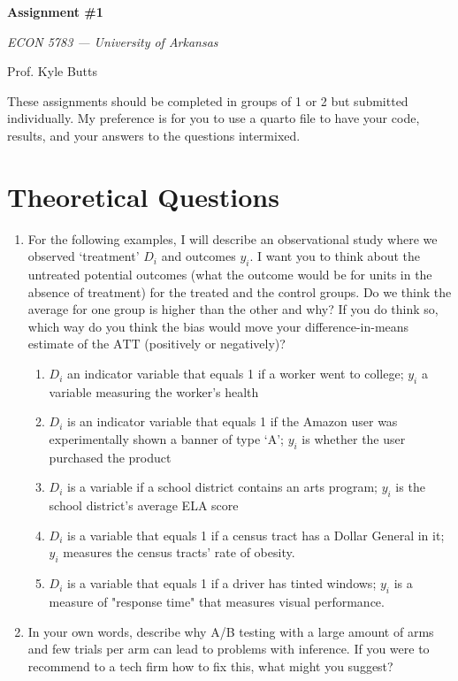 \documentclass[12pt]{article}
\begin{document}
\begin{center}
  {\Huge\bf Assignment \#1}
  
  \smallskip
  {\large\it  ECON 5783 — University of Arkansas}

  \medskip
  {\large Prof. Kyle Butts}
\end{center}

These assignments should be completed in groups of 1 or 2 but submitted individually. 
My preference is for you to use a quarto file to have your code, results, and your answers to the questions intermixed. 

\section*{Theoretical Questions}

\begin{enumerate}
  \item For the following examples, I will describe an observational study where we observed `treatment' $D_i$ and outcomes $y_i$. I want you to think about the untreated potential outcomes (what the outcome would be for units in the absence of treatment) for the treated and the control groups. Do we think the average for one group is higher than the other and why? If you do think so, which way do you think the bias would move your difference-in-means estimate of the $\text{ATT}$ (positively or negatively)?
  \begin{enumerate}
    \item $D_i$ an indicator variable that equals 1 if a worker went to college; $y_i$ a variable measuring the worker's health
    
    \item $D_i$ is an indicator variable that equals 1 if the Amazon user was experimentally shown a banner of type `A'; $y_i$ is whether the user purchased the product
    
    \item $D_i$ is a variable if a school district contains an arts program; $y_i$ is the school district's average ELA score
    
    \item $D_i$ is a variable that equals 1 if a census tract has a Dollar General in it; $y_i$ measures the census tracts' rate of obesity.
    
    \item $D_i$ is a variable that equals 1 if a driver has tinted windows; $y_i$ is a measure of "response time" that measures visual performance.
  \end{enumerate}

  \item In your own words, describe why A/B testing with a large amount of arms and few trials per arm can lead to problems with inference. If you were to recommend to a tech firm how to fix this, what might you suggest?
\end{enumerate}
\end{document}
